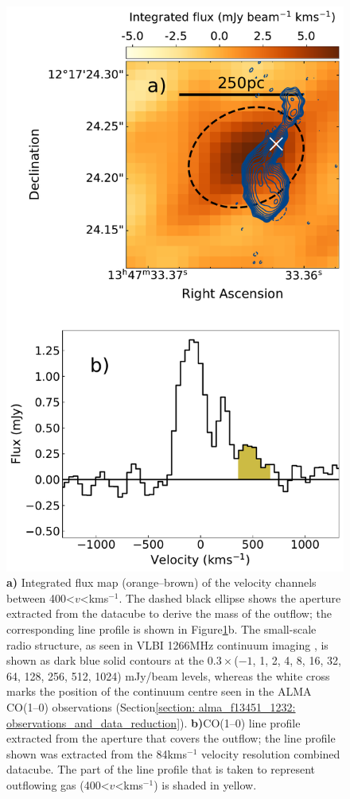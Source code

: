 \begin{figure}[!h]
    \centering
    \includegraphics[width=0.65\linewidth]{figures/alma_f13451_1232/outflow_moment_map.pdf}
    \caption[\textbf{a)} Integrated CO(1--0) flux map of the nuclear outflow in F13451+1232, with VLBI 1266\;MHz continuum imaging from \citet{Morganti2013_4c1250} showing the small-scale radio structure; \textbf{b)} CO(1--0) velocity profile of the nuclear outflow.]{\textbf{a)} Integrated flux map (orange--brown) of the velocity channels between 400\;\textless\;$v$\;\textless{}\;km\;s$^{-1}$. The dashed black ellipse shows the aperture extracted from the datacube to derive the mass of the outflow; the corresponding line profile is shown in Figure\;\ref{fig: alma_f13451_1232: outflow_moment_map}b. The small-scale radio structure, as seen in VLBI 1266\;MHz continuum imaging \citep{Morganti2013_4c1250}, is shown as dark blue solid contours at the $0.3\times$($-1$, 1, 2, 4, 8, 16, 32, 64, 128, 256, 512, 1024) mJy/beam levels, whereas the white cross marks the position of the continuum centre seen in the ALMA CO(1--0) observations (Section\;\ref{section: alma_f13451_1232: observations_and_data_reduction}). \textbf{b)}\;CO(1--0) line profile extracted from the aperture that covers the outflow; the line profile shown was extracted from the 84\;km\;s$^{-1}$ velocity resolution combined datacube. The part of the line profile that is taken to represent outflowing gas (400\;\textless\;$v$\;\textless{}\;km\;s$^{-1}$) is shaded in yellow.}
    \label{fig: alma_f13451_1232: outflow_moment_map}
\end{figure}

